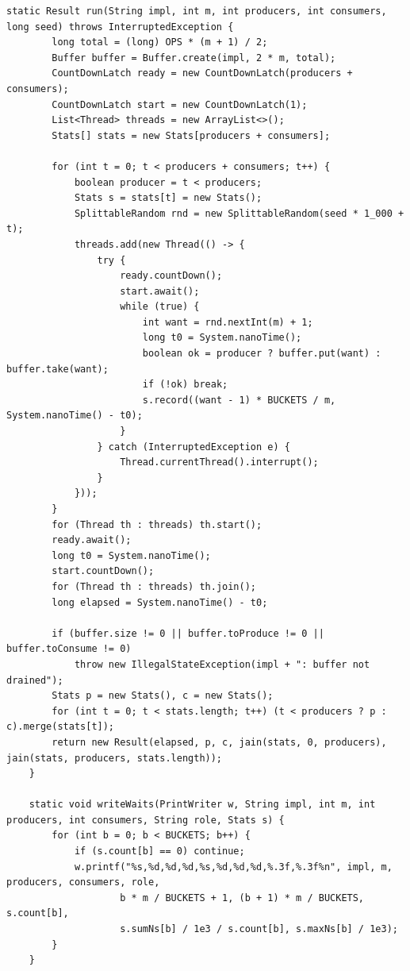 \documentclass[11pt,a4paper]{article}
\begin{document}
\begin{lstlisting}[caption={Klasa \textbf{Main} (\texttt{src/Main.java})}]
    static Result run(String impl, int m, int producers, int consumers, long seed) throws InterruptedException {
        long total = (long) OPS * (m + 1) / 2;
        Buffer buffer = Buffer.create(impl, 2 * m, total);
        CountDownLatch ready = new CountDownLatch(producers + consumers);
        CountDownLatch start = new CountDownLatch(1);
        List<Thread> threads = new ArrayList<>();
        Stats[] stats = new Stats[producers + consumers];

        for (int t = 0; t < producers + consumers; t++) {
            boolean producer = t < producers;
            Stats s = stats[t] = new Stats();
            SplittableRandom rnd = new SplittableRandom(seed * 1_000 + t);
            threads.add(new Thread(() -> {
                try {
                    ready.countDown();
                    start.await();
                    while (true) {
                        int want = rnd.nextInt(m) + 1;
                        long t0 = System.nanoTime();
                        boolean ok = producer ? buffer.put(want) : buffer.take(want);
                        if (!ok) break;
                        s.record((want - 1) * BUCKETS / m, System.nanoTime() - t0);
                    }
                } catch (InterruptedException e) {
                    Thread.currentThread().interrupt();
                }
            }));
        }
        for (Thread th : threads) th.start();
        ready.await();
        long t0 = System.nanoTime();
        start.countDown();
        for (Thread th : threads) th.join();
        long elapsed = System.nanoTime() - t0;

        if (buffer.size != 0 || buffer.toProduce != 0 || buffer.toConsume != 0)
            throw new IllegalStateException(impl + ": buffer not drained");
        Stats p = new Stats(), c = new Stats();
        for (int t = 0; t < stats.length; t++) (t < producers ? p : c).merge(stats[t]);
        return new Result(elapsed, p, c, jain(stats, 0, producers), jain(stats, producers, stats.length));
    }

    static void writeWaits(PrintWriter w, String impl, int m, int producers, int consumers, String role, Stats s) {
        for (int b = 0; b < BUCKETS; b++) {
            if (s.count[b] == 0) continue;
            w.printf("%s,%d,%d,%d,%s,%d,%d,%d,%.3f,%.3f%n", impl, m, producers, consumers, role,
                    b * m / BUCKETS + 1, (b + 1) * m / BUCKETS, s.count[b],
                    s.sumNs[b] / 1e3 / s.count[b], s.maxNs[b] / 1e3);
        }
    }


\end{lstlisting}
\end{document}
